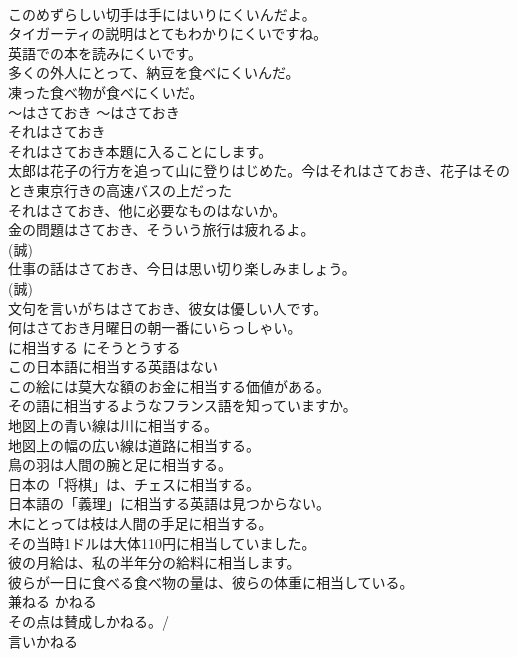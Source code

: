 \documentclass[8pt]{extreport}
\begin{document}
\begin{CJK}{UTF8}{min}
\\	このめずらしい切手は手にはいりにくいんだよ。  
\\	タイガーティの説明はとてもわかりにくいですね｡  
\\	英語での本を読みにくいです。  
\\	多くの外人にとって、納豆を食べにくいんだ。   
\\	凍った食べ物が食べにくいだ。  
\\	〜はさておき	〜はさておき	
\\	それはさておき	
\\	それはさておき本題に入ることにします。  
\\	太郎は花子の行方を追って山に登りはじめた。今はそれはさておき、花子はそのとき東京行きの高速バスの上だった  
\\	それはさておき、他に必要なものはないか。   
\\	金の問題はさておき、そういう旅行は疲れるよ。  
\\	(誠)
\\	仕事の話はさておき、今日は思い切り楽しみましょう。  
\\	(誠)
\\	文句を言いがちはさておき、彼女は優しい人です。  
\\	何はさておき月曜日の朝一番にいらっしゃい。  
\\	に相当する	にそうとうする	
\\	この日本語に相当する英語はない  
\\	この絵には莫大な額のお金に相当する価値がある。   
\\	その語に相当するようなフランス語を知っていますか。  
\\	地図上の青い線は川に相当する。   
\\	地図上の幅の広い線は道路に相当する。   
\\	鳥の羽は人間の腕と足に相当する。   
\\	日本の「将棋」は、チェスに相当する。   
\\	日本語の「義理」に相当する英語は見つからない。   
\\	木にとっては枝は人間の手足に相当する。  
\\	その当時1ドルは大体110円に相当していました。  
\\	彼の月給は、私の半年分の給料に相当します。  
\\	彼らが一日に食べる食べ物の量は、彼らの体重に相当している。  
\\	兼ねる	かねる	
\\	その点は賛成しかねる。/ 
\\	言いかねる   

\end{CJK}
\end{document}
